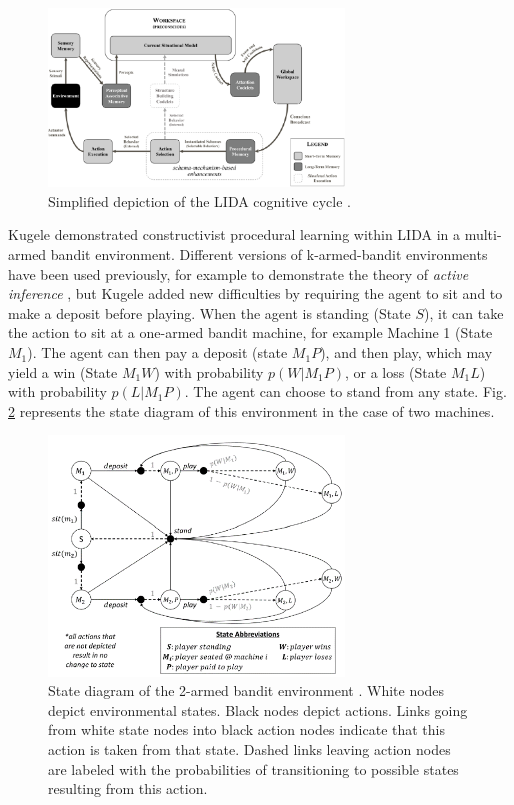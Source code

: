 \documentclass[runningheads]{llncs}
\begin{document}
\begin{figure}
	\centering
	\includegraphics[width=0.7\textwidth]{Figure_LIDA.png}
	\caption{Simplified depiction of the LIDA cognitive cycle \cite[Fig. 4]{kugele2025_constructivist}.
	} 
	\label{fig:lida}
\end{figure}

Kugele \cite{kugele2025_constructivist} demonstrated constructivist procedural learning within LIDA in a multi-armed bandit environment.
Different versions of k-armed-bandit environments have been used previously, for example to demonstrate the theory of \textit{active inference} \cite{smith_step-by-step_2022}, 
but Kugele added new difficulties by requiring the agent to sit and to make a deposit before playing.  
When the agent is standing (State $S$), it can take the action to sit at a one-armed bandit machine, for example Machine 1 (State $M_1$).
The agent can then pay a deposit (state $M_1P$), and then play, which may yield a win (State $M_1W$) with probability $p(W|M_1P)$, or a loss (State $M_1L$) with probability $p(L|M_1P)$. The agent can choose to stand from any state.
Fig. \ref{fig:lida_bench} represents the state diagram of this environment in the case of two machines. 

\begin{figure}
	\centering
	\includegraphics[width=0.7\textwidth]{Figure_LIDA_bench.png}
	\caption{State diagram of the 2-armed bandit environment \cite[Fig. 5]{kugele2025_constructivist}.
	White nodes depict environmental states.
	Black nodes depict actions. 
	Links going from white state nodes into black action nodes indicate that this action is taken from that state. 
	Dashed links leaving action nodes are labeled with the probabilities of transitioning to possible states resulting from this action.} 
	\label{fig:lida_bench}
\end{figure}
\end{document}
